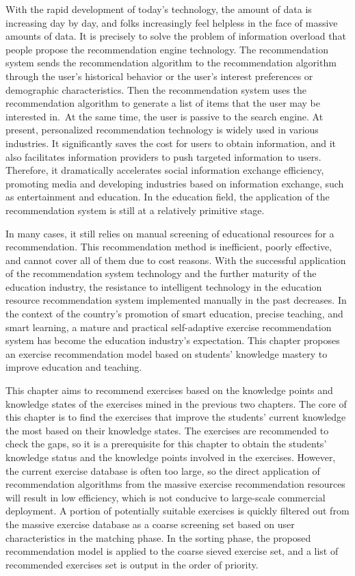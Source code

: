 With the rapid development of today's technology, the amount of data is increasing day by day, and folks increasingly feel helpless in the face of massive amounts of data. It is precisely to solve the problem of information overload that people propose the recommendation engine technology. The recommendation system sends the recommendation algorithm to the recommendation algorithm through the user's historical behavior or the user's interest preferences or demographic characteristics. Then the recommendation system uses the recommendation algorithm to generate a list of items that the user may be interested in.\ At the same time, the user is passive to the search engine. At present, personalized recommendation technology is widely used in various industries. It significantly saves the cost for users to obtain information, and it also facilitates information providers to push targeted information to users. Therefore, it dramatically accelerates social information exchange efficiency, promoting media and developing industries based on information exchange, such as entertainment and education. In the education field, the application of the recommendation system is still at a relatively primitive stage.

In many cases, it still relies on manual screening of educational resources for a recommendation. This recommendation method is inefficient, poorly effective, and cannot cover all of them due to cost reasons. With the successful application of the recommendation system technology and the further maturity of the education industry, the resistance to intelligent technology in the education resource recommendation system implemented manually in the past decreases. In the context of the country's promotion of smart education, precise teaching, and smart learning, a mature and practical self-adaptive exercise recommendation system has become the education industry's expectation. This chapter proposes an exercise recommendation model based on students' knowledge mastery to improve education and teaching.

This chapter aims to recommend exercises based on the knowledge points and knowledge states of the exercises mined in the previous two chapters. The core of this chapter is to find the exercises that improve the students' current knowledge the most based on their knowledge states. The exercises are recommended to check the gaps, so it is a prerequisite for this chapter to obtain the students' knowledge status and the knowledge points involved in the exercises.  However, the current exercise database is often too large, so the direct application of recommendation algorithms from the massive exercise recommendation resources will result in low efficiency, which is not conducive to large-scale commercial deployment. A portion of potentially suitable exercises is quickly filtered out from the massive exercise database as a coarse screening set based on user characteristics in the matching phase. In the sorting phase, the proposed recommendation model is applied to the coarse sieved exercise set, and a list of recommended exercises set is output in the order of priority.

